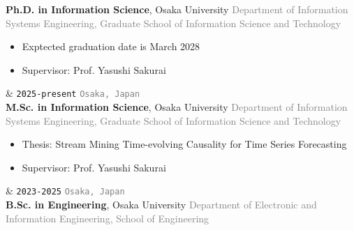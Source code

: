 \documentclass[9pt,a4paper]{article}
\newcommand{\OU}{Osaka University}
\newcommand{\Prof}[1]{Prof.\! #1}
\newcommand{\YSakurai}{Yasushi Sakurai}
\newcommand{\Duration}[2]{\fontsize{10pt}{0}\selectfont \texttt{#1-#2}}
\newcommand{\Ongoing}{present}
\begin{document}
\begin{EntriesTableRight}
  \textbf{Ph.D. in Information Science}, \OU
  \vspace{-0.1em}
  \newline
  \textcolor{gray}{{\fontsize{9pt}{0}\selectfont Department of Information Systems Engineering, Graduate School of Information Science and Technology}}
  \vspace{-0.1em}
  \newline
  {\setlength{\leftmargini}{17.2pt}
  \begin{itemize}
  \vspace{-1.0em}
      \item Exptected graduation date is March 2028
      \item Supervisor: \Prof{\YSakurai}
  \vspace{-1.3em}
  \end{itemize}}
  &
  \hfill
  \Duration{2025}{\Ongoing}
  \vspace{0.30em}
  \newline
  \hfill
  \textcolor{gray}{\fontsize{9pt}{0}\selectfont \texttt{Osaka, \!\!Japan}~}
  \\[4.45em]
  \textbf{M.Sc.\! in Information Science}, \OU
  \vspace{-0.1em}
  \newline
  \textcolor{gray}{{\fontsize{9pt}{0}\selectfont Department of Information Systems Engineering, Graduate School of Information Science and Technology}}
  \vspace{-0.1em}
  \newline
  {\setlength{\leftmargini}{17.2pt}
  \begin{itemize}
  \vspace{-1.0em}
      \item Thesis: Stream Mining Time-evolving Causality for Time Series Forecasting
      \item Supervisor: \Prof{\YSakurai}
  \vspace{-1.3em}
  \end{itemize}}
  &
  \hfill
  \Duration{2023}{2025}
  \vspace{0.5em}
  \newline
  \hfill
  \textcolor{gray}{\fontsize{9pt}{0}\selectfont \texttt{Osaka, \!\!Japan}~}
  \\[4.45em]
  \textbf{B.Sc.\! in Engineering}, \OU
  \vspace{-0.1em}
  \newline
  \textcolor{gray}{{\fontsize{9pt}{0}\selectfont Department of Electronic and Information Engineering, School of Engineering}}

\end{EntriesTableRight}
\end{document}
